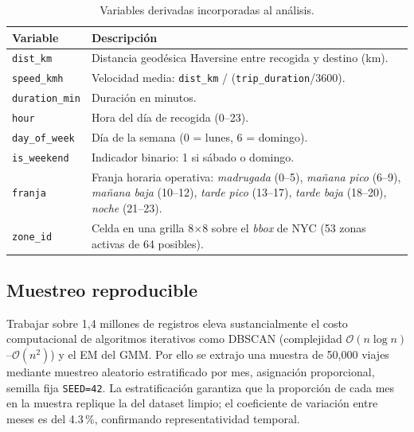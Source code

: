 \documentclass[12pt, a4paper]{article}
\begin{document}
\begin{table}[H]
  \centering
  \caption{Variables derivadas incorporadas al análisis.}
  \label{tab:features}
  \small
  \begin{tabular}{lp{9cm}}
    \toprule
    \textbf{Variable} & \textbf{Descripción} \\
    \midrule
    \texttt{dist\_km}      & Distancia geodésica Haversine entre recogida y destino (km). \\
    \texttt{speed\_kmh}    & Velocidad media: \texttt{dist\_km} / (\texttt{trip\_duration}/3600). \\
    \texttt{duration\_min} & Duración en minutos. \\
    \texttt{hour}          & Hora del día de recogida (0--23). \\
    \texttt{day\_of\_week} & Día de la semana (0 = lunes, 6 = domingo). \\
    \texttt{is\_weekend}   & Indicador binario: 1 si sábado o domingo. \\
    \texttt{franja}        & Franja horaria operativa: \emph{madrugada} (0--5), \emph{mañana pico} (6--9), \emph{mañana baja} (10--12), \emph{tarde pico} (13--17), \emph{tarde baja} (18--20), \emph{noche} (21--23). \\
    \texttt{zone\_id}      & Celda en una grilla 8$\times$8 sobre el \emph{bbox} de NYC (53 zonas activas de 64 posibles). \\
    \bottomrule
  \end{tabular}
\end{table}

\subsection{Muestreo reproducible}

Trabajar sobre 1{,}4 millones de registros eleva sustancialmente el costo computacional de algoritmos iterativos como DBSCAN (complejidad $\mathcal{O}(n\log n)$--$\mathcal{O}(n^2)$) y el EM del GMM. Por ello se extrajo una muestra de 50{,}000 viajes mediante muestreo aleatorio estratificado por mes, asignación proporcional, semilla fija \texttt{SEED=42}. La estratificación garantiza que la proporción de cada mes en la muestra replique la del dataset limpio; el coeficiente de variación entre meses es del 4{.}3\,\%, confirmando representatividad temporal.
\end{document}
